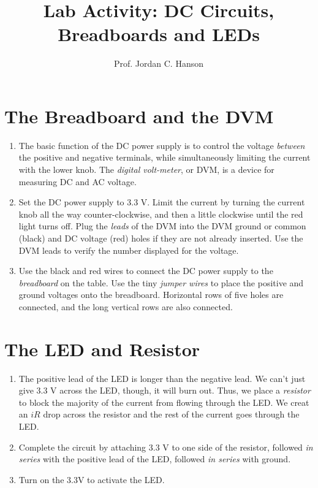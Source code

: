\documentclass{article}
\begin{document}
\title{Lab Activity: DC Circuits, Breadboards and LEDs}
\author{Prof. Jordan C. Hanson}

\maketitle

\section{The Breadboard and the DVM}

\begin{enumerate}
\item The basic function of the DC power supply is to control the voltage \textit{between} the positive and negative terminals, while simultaneously limiting the current with the lower knob.  The \textit{digital volt-meter}, or DVM, is a device for measuring DC and AC voltage.
\item Set the DC power supply to 3.3 V.  Limit the current by turning the current knob all the way counter-clockwise, and then a little clockwise until the red light turns off.  Plug the \textit{leads} of the DVM into the DVM ground or common (black) and DC voltage (red) holes if they are not already inserted.  Use the DVM leads to verify the number displayed for the voltage.
\item Use the black and red wires to connect the DC power supply to the \textit{breadboard} on the table.  Use the tiny \textit{jumper wires} to place the positive and ground voltages onto the breadboard.  Horizontal rows of five holes are connected, and the long vertical rows are also connected.
\end{enumerate}

\section{The LED and Resistor}

\begin{enumerate}
\item The positive lead of the LED is longer than the negative lead.  We can't just give 3.3 V across the LED, though, it will burn out.  Thus, we place a \textit{resistor} to block the majority of the current from flowing through the LED.  We creat an $iR$ drop across the resistor and the rest of the current goes through the LED.
\item Complete the circuit by attaching 3.3 V to one side of the resistor, followed \textit{in series} with the positive lead of the LED, followed \textit{in series} with ground.
\item Turn on the 3.3V to activate the LED.
\end{enumerate}
\end{document}
